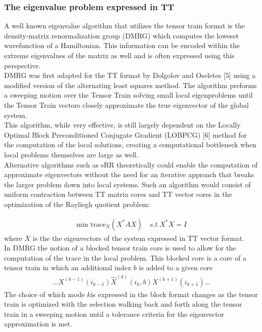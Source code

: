 \documentclass[%
 aip,12pt
 amsmath,amssymb,
 reprint,%
]{revtex4-1}
\begin{document}
\subsubsection{\label{sec:level3} The eigenvalue problem expressed in TT }

A well known eigenvalue algorithm that utilizes the tensor train format is the  density-matrix renormalization group (DMRG) which computes the loweset wavefunction of a Hamiltonian. This information can be encoded within the extreme eigenvalues of the matrix as well and is often expressed using this perspective. \\
DMRG was first adapted for the TT format by Dolgolov and Oseletes [5] using a modified version of the alternating least squares method. The algorithm preforms a sweeping motion over the Tensor Train solving small local eigenproblems until the Tensor Train vectors closely approximate the true eigenvector of the global system.
\\
This algorithm, while very effective,  is still largely dependent on the Locally Optimal Block Preconditioned Conjugate Gradient (LOBPCG) [6] method for the computation of the local solutions, creating a computational bottleneck when local problems themselves are large as well.\\
Alternative algorithms such as sRR theoretically could enable the computation of approximate eigenvectors without the need for an iterative approach that breaks the larger problem down into local systems. Such an algorithm would consist of uniform contraction between TT matrix cores and TT vector cores in the optimization of the Rayliegh quotient problem:

\begin{eqnarray}
  \text{min trace}_X(X^*AX)\quad s.t. X^*X=I
  \label{eq:five}
\end{eqnarray}
 where $X$ is the the eigenvectors of the system expressed in TT vector format. \\
 In DMRG  the notion of a blocked tensor train core is used to allow for the computation of the trace in the local problem. This blocked core is a core of a tensor train in which an additional index $b$ is added to a given core
 \begin{eqnarray}
 \dots X^{(k-1)}\left(i_{k-1}\right) \widehat{X}^{(k)}\left(i_{k}, b\right) X^{(k+1)}\left(i_{k+1}\right) \ldots
\end{eqnarray}
The choice of which mode $k$is expressed in the block format changes as the tensor train is optimized with the selection walking back and forth along the tensor train in a sweeping motion until a tolerance criteria for the eigenvector approximation is met.
\end{document}
